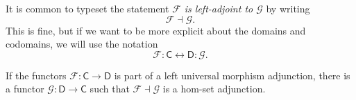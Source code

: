 \documentclass[main.tex]{subfiles}
\begin{document}
\begin{note}
  It is common to typeset the statement \emph{$\mathcal{F}$ is left-adjoint to $\mathcal{G}$} by writing
  \begin{equation*}
    \mathcal{F} \dashv \mathcal{G}.
  \end{equation*}
  This is fine, but if we want to be more explicit about the domains and codomains, we will use the notation
  \begin{equation*}
    \mathcal{F} : \mathsf{C} \leftrightarrow \mathsf{D} : \mathcal{G}.
  \end{equation*}
\end{note}

\begin{lemma}
  \label{lemma:universal_morphism_adjunction_implies_hom_set_adjunction}
  If the functors $\mathcal{F}\colon \mathsf{C} \to \mathsf{D}$ is part of a left universal morphism adjunction, there is a functor $\mathcal{G}\colon \mathsf{D} \to \mathsf{C}$ such that $\mathcal{F} \dashv \mathcal{G}$ is a hom-set adjunction.
\end{lemma}
\end{document}
